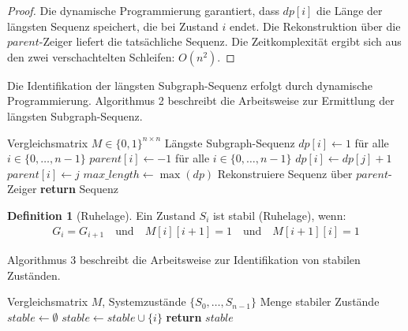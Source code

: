 \documentclass[a4paper,12pt]{article}
\theoremstyle{definition}
\newtheorem{definition}{Definition}
\begin{document}
\begin{proof}
	Die dynamische Programmierung garantiert, dass $dp[i]$ die Länge der längsten Sequenz speichert, die bei Zustand $i$ endet. Die Rekonstruktion über die $parent$-Zeiger liefert die tatsächliche Sequenz. Die Zeitkomplexität ergibt sich aus den zwei verschachtelten Schleifen: $O(n^2)$.
\end{proof}

Die Identifikation der längsten Subgraph-Sequenz erfolgt durch dynamische Programmierung. Algorithmus 2 beschreibt die Arbeitsweise zur Ermittlung der längsten Subgraph-Sequenz.

\begin{algorithm}[H]
	\caption{Längste Subgraph-Sequenz}
	\begin{algorithmic}[1]
		\Require Vergleichsmatrix $M \in \{0,1\}^{n \times n}$
		\Ensure Längste Subgraph-Sequenz
		\State $dp[i] \gets 1$ für alle $i \in \{0, \ldots, n-1\}$
		\State $parent[i] \gets -1$ für alle $i \in \{0, \ldots, n-1\}$
		\State $dp[i] \gets dp[j] + 1$
		\State $parent[i] \gets j$
		\EndIf
		\EndIf
		\EndFor
		\EndFor
		\State $max\_length \gets \max(dp)$
		\State Rekonstruiere Sequenz über $parent$-Zeiger
		\State \textbf{return} Sequenz
	\end{algorithmic}
\end{algorithm}

\begin{definition}[Ruhelage]
Ein Zustand $S_i$ ist stabil (Ruhelage), wenn:
\begin{align}
	G_i = G_{i+1} \quad \text{und} \quad M[i][i+1] = 1 \quad \text{und} \quad M[i+1][i] = 1
\end{align}
\end{definition}

Algorithmus 3 beschreibt die Arbeitsweise zur Identifikation von stabilen Zuständen.
\begin{algorithm}[H]
	\caption{Identifikation stabiler Zustände}
	\begin{algorithmic}[1]
		\Require Vergleichsmatrix $M$, Systemzustände $\{S_0, \ldots, S_{n-1}\}$
		\Ensure Menge stabiler Zustände
		\State $stable \gets \emptyset$
		 
		\State $stable \gets stable \cup \{i\}$
		\EndIf
		\EndIf
		\EndFor
		\State \textbf{return} $stable$
	\end{algorithmic}
\end{algorithm}
\end{document}
